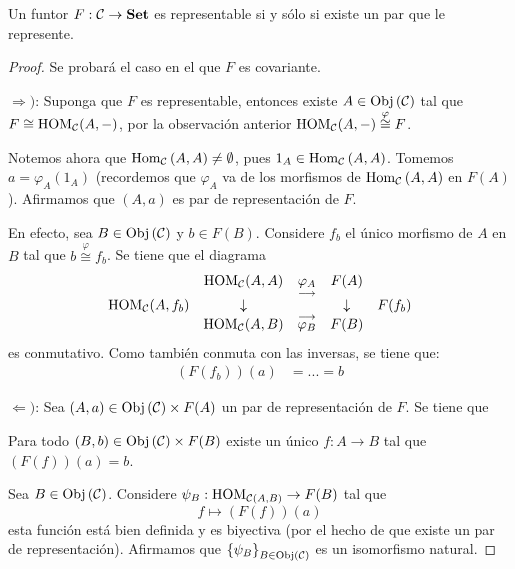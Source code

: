 \documentclass[12pt]{report}
\newcounter{it}
\theoremstyle{largebreak}
\newcommand\cf[3]{\ensuremath{#1:#2\rightarrow#3}}
\newcommand{\Obj}[1]{\ensuremath{\textup{Obj}\left(#1\right)}}
\newcommand{\Hom}[3]{\ensuremath{\textup{Hom}_{#1}\left(#2,#3\right)}}
\newcommand{\Cat}[1]{\ensuremath{\textup{\textbf{#1}}}}
\begin{document}
    \begin{propo}
        Un funtor $\cf{F}{\mathcal{C}}{\Cat{Set}}$ es representable si y sólo si existe un par que le represente.
    \end{propo}

    \begin{proof}
        Se probará el caso en el que $F$ es covariante.

        $\Rightarrow)$: Suponga que $F$ es representable, entonces existe $A\in\Obj{\mathcal{C}}$ tal que $F\cong \textup{HOM}_{\mathcal{C}}(A,-)$, por la observación anterior $\textup{HOM}_{\mathcal{C}}(A,-)\overset{\varphi}{\cong}F$.

        Notemos ahora que $\Hom{\mathcal{C}}{A}{A}\neq\emptyset$, pues $1_A\in\Hom{\mathcal{C}}{A}{A}$. Tomemos $a=\varphi_A(1_A)$ (recordemos que $\varphi_A$ va de los morfismos de $\Hom{\mathcal{C}}{A}{A}$ en $F(A)$). Afirmamos que $(A,a)$ es par de representación de $F$.

        En efecto, sea $B\in\Obj{\mathcal{C}}$ y $b\in F(B)$. Considere $f_b$ el único morfismo de $A$ en $B$ tal que $b\overset{\varphi}{\cong}f_b$. Se tiene que el diagrama
        \begin{equation*}
            \begin{array}{rcccl}
                & \textup{HOM}_{\mathcal{C}}(A,A) & \underset{\longrightarrow}{\varphi_{A}} & F(A) &\\
                \textup{HOM}_{\mathcal{C}}(A,f_b) & \downarrow & & \downarrow & F(f_b) \\
                & \textup{HOM}_{\mathcal{C}}(A,B) & \overset{\longrightarrow}{\varphi_{B}} & F(B) &\\
            \end{array}
        \end{equation*}
        es conmutativo. Como también conmuta con las inversas, se tiene que:
        \begin{equation*}
            \begin{split}
                \left(F(f_b)\right)(a)&=... =b
            \end{split}
        \end{equation*}

        $\Leftarrow)$: Sea $(A,a)\in\Obj{\mathcal{C}}\times F(A)$ un par de representación de $F$. Se tiene que

        Para todo $(B,b)\in\Obj{\mathcal{C}}\times F(B)$ existe un único $\cf{f}{A}{B}$ tal que $(F(f))(a)=b$.

        Sea $B\in\Obj{\mathcal{C}}$. Considere $\cf{\psi_B}{\HOM{\mathcal{C}(A,B)}}{F(B)}$ tal que
        \begin{equation*}
            f\mapsto (F(f))(a)
        \end{equation*}
        esta función está bien definida y es biyectiva (por el hecho de que existe un par de representación). Afirmamos que $\left\{\psi_B\right\}_{B\in\Obj{\mathcal{C}}}$ es un isomorfismo natural.


\end{proof}
\end{document}

